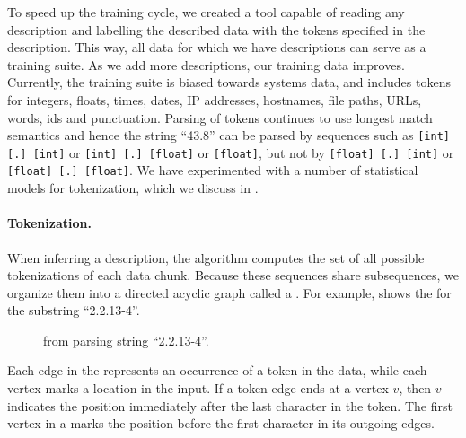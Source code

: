 To speed up the training cycle, we created a tool
capable of reading any \pads{} description and labelling the
described data with the tokens specified in the description.  This way,
all data for which we have \pads{} descriptions can serve as a training
suite. As we add more descriptions, our training data
improves.  Currently, the training suite is biased towards systems 
data, and includes
tokens for integers, floats, times, dates, IP addresses, hostnames, 
file paths, URLs, words, ids and punctuation. 
Parsing of tokens continues to use longest match semantics
and hence the string ``43.8'' can be parsed by sequences such as
{\tt [int] [.] [int]} or {\tt [int] [.] [float]} or {\tt [float]},
but not by {\tt [float] [.] [int]} or {\tt [float] [.] [float]}.
We have experimented with a number of statistical models for
tokenization, which we discuss in .

\paragraph*{Tokenization.}

When inferring a description, the algorithm computes the set of all
possible tokenizations of each data chunk.  Because these sequences
share subsequences, we organize them into a directed acyclic graph
called a \seqset{}.  For example,  shows the \seqset{} for the substring 
``2.2.13-4''. 


\begin{figure}[th]
\begin{center}
\shrink
{}
\end{center}
\caption{\seqset{} from parsing string ``2.2.13-4''.}\label{fig:seqset}
\shrink
\end{figure}

\noindent
Each edge in the \seqset{} represents an occurrence of a token in the
data, while each vertex marks a location in the input.  If a token
edge ends at a vertex $v$, then $v$ indicates the position immediately
after the last character in the token.  The first vertex in a
\seqset{} marks the position before the first character in its
outgoing edges. 

